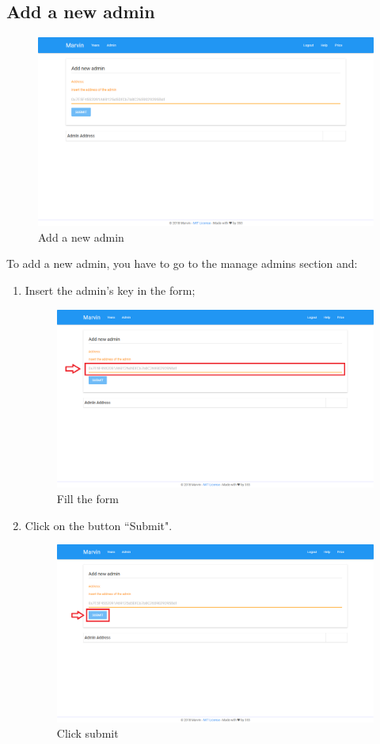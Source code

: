 \documentclass[ManualeUtente]{subfiles}
\begin{document}
\subsection{Add a new admin}
\begin{figure}[H]
	\centering
	\includegraphics[width=0.7\linewidth]{image/UniversityAddAmin}
	\caption[Add admin]{Add a new admin}
	\label{fig:Add a new admin}
\end{figure}
To add a new admin, you have to go to the manage admins section and:
\begin{enumerate}
	\item Insert the admin's key in the form;
	\begin{figure}[H]
		\centering
		\includegraphics[width=0.7\linewidth]{image/UniversityAddAmin1}
		\caption[Add admin form]{Fill the form}
		\label{fig:Add a new admin, fill the form}
	\end{figure}
	\item Click on the button ``Submit".
	\begin{figure}[H]
		\centering
		\includegraphics[width=0.7\linewidth]{image/UniversityAddAmin2}
		\caption[Add admin submit]{Click submit}
		\label{fig:Add a new admin, click submit}
	\end{figure}
\end{enumerate}
\end{document}
